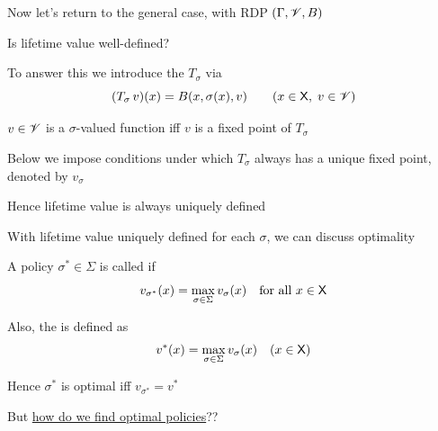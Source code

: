 \begin{frame}

    Now let's return to the general case, with RDP $(\Gamma, \mathscr V, B)$

        \vspace{0.5em}
        \vspace{0.5em}
    Is lifetime value well-defined?
        \vspace{0.5em}
        \vspace{0.5em}

    To answer this we introduce the  $T_\sigma$ via
    \begin{equation*}
        (T_\sigma \, v)(x) = B(x, \sigma(x), v)
        \qquad (x \in \mathsf X,\; v \in \mathscr V)
    \end{equation*}

     $v \in \mathscr V$ is a $\sigma$-valued function iff $v$ is a fixed point of
    $T_\sigma$
    
        \vspace{0.5em}
        \vspace{0.5em}

    Below we impose conditions under which $T_\sigma$ always has a unique
    fixed point, denoted by $v_\sigma$

        \vspace{0.5em}
        \vspace{0.5em}
    Hence lifetime value is always uniquely defined


\end{frame}


\begin{frame}
    
    With lifetime value uniquely defined for each $\sigma$, we can discuss
    optimality

        \vspace{0.5em}
        \vspace{0.5em}
    A policy $\sigma^* \in \Sigma$ is called  if
    \begin{equation*}
        v_{\sigma^*}(x) = \max_{\sigma \in \Sigma} v_\sigma(x)
        \quad \text{for all } x \in \mathsf X
    \end{equation*}

        \vspace{0.5em}
        \vspace{0.5em}
    Also, the  is defined as 
    \begin{equation*}
        v^*(x) = \max_{\sigma \in \Sigma} v_\sigma(x)
        \quad (x \in \mathsf X)
    \end{equation*}

        \vspace{0.5em}
        \vspace{0.5em}
    Hence $\sigma^*$ is optimal iff $v_{\sigma^*} = v^*$

        \vspace{0.5em}
        \vspace{0.5em}

    But \underline{how do we find optimal policies}??

\end{frame}



